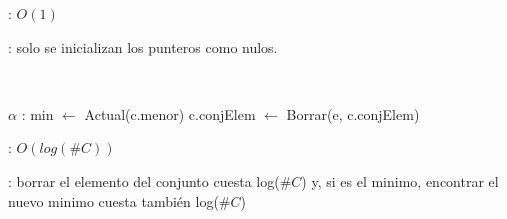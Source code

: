 \begin{Algoritmos}
	\complejidad: $O(1)$

	\justifcomp: solo se inicializan los punteros como nulos.

	~

	\begin{algorithm}[H]
		\NoCaptionOfAlgo
		\caption{}
		$\alpha$ : min $\leftarrow$ Actual(c.menor)
		c.conjElem $\leftarrow$ Borrar(e, c.conjElem)
	\end{algorithm}

	\complejidad: $O(log(\#C))$

	\justifcomp: borrar el elemento del conjunto cuesta log($\#C$) y, si es el minimo, encontrar el nuevo minimo cuesta también log($\#C$)

	~


	\begin{algorithm}[H]
		\NoCaptionOfAlgo
		\caption{}
		\BlankLine
	\end{algorithm}


\end{Algoritmos}